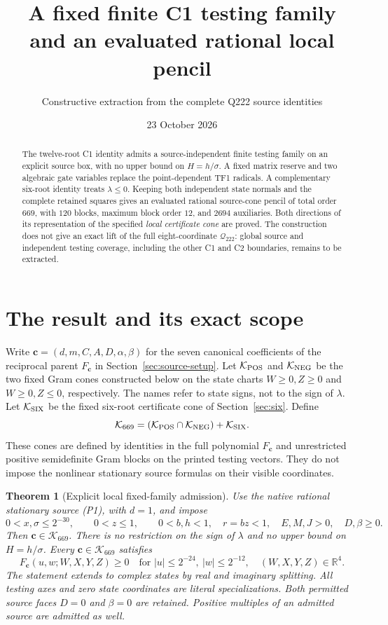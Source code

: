 \documentclass[10pt,a4paper]{article}
\title{A fixed finite C1 testing family\\and an evaluated rational local pencil}
\author{Constructive extraction from the complete Q222 source identities}
\date{23 October 2026}
\newtheorem{theorem}{Theorem}
\newcommand{\R}{\mathbb R}
\newcommand{\cone}{\mathcal K}
\begin{document}
\maketitle
\begin{abstract}
The twelve-root C1 identity admits a source-independent finite testing family
on an explicit source box, with no upper bound on $H=h/\sigma$.
A fixed matrix reserve and two algebraic gate variables replace the
point-dependent TF1 radicals. A complementary six-root identity treats
$\lambda\le0$. Keeping both independent state normals and the complete
retained squares gives an evaluated rational source-cone pencil of total
order $669$, with $120$ blocks, maximum block order $12$, and $2694$
auxiliaries. Both directions of its representation of the specified
\emph{local certificate cone} are proved. The construction does not give
an exact lift of the full eight-coordinate $\mathcal Q_{222}$: global
source and independent testing coverage, including the other C1 and C2
boundaries, remains to be extracted.
\end{abstract}

\section{The result and its exact scope}
Write $\mathbf c=(d,m,C,A,D,\alpha,\beta)$ for the seven canonical
coefficients of the reciprocal parent $F_{\mathbf c}$ in
Section~\ref{sec:source-setup}. Let $\cone_{\rm POS}$ and
$\cone_{\rm NEG}$ be the two fixed Gram cones constructed below on
the state charts $W\ge0,Z\ge0$ and $W\ge0,Z\le0$, respectively.
The names refer to state signs, not to the sign of $\lambda$.
Let $\cone_{\rm SIX}$ be the fixed six-root certificate cone of
Section~\ref{sec:six}. Define
\[
 \cone_{669}=(\cone_{\rm POS}\cap\cone_{\rm NEG})+\cone_{\rm SIX}.
\]
These cones are defined by identities in the full polynomial
$F_{\mathbf c}$ and unrestricted positive semidefinite Gram blocks
on the printed testing vectors. They do not impose the nonlinear
stationary source formulas on their visible coordinates.

\begin{theorem}[Explicit local fixed-family admission]\label{thm:main}
Use the native rational stationary source (P1), with $d=1$, and impose
\[
 0<x,\sigma\le2^{-30},\qquad 0<z\le1,\qquad
 0<b,h<1,\quad r=bz<1,\quad E,M,J>0,\quad D,\beta\ge0.
 \tag{D}
\]
Then $\mathbf c\in\cone_{669}$. There is no restriction on the sign of
$\lambda$ and no upper bound on $H=h/\sigma$.
Every $\mathbf c\in\cone_{669}$ satisfies
\[
 F_{\mathbf c}(u,w;W,X,Y,Z)\ge0
 \quad\text{for } |u|\le2^{-24},\ |w|\le2^{-12},
 \quad (W,X,Y,Z)\in\R^4.
 \tag{T}
\]
The statement extends to complex states by real and imaginary splitting.
All testing axes and zero state coordinates are literal specializations.
Both permitted source faces $D=0$ and $\beta=0$ are retained.
Positive multiples of an admitted source are admitted as well.
\end{theorem}
\end{document}
